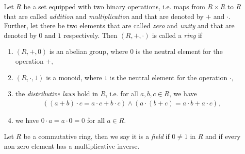 \begin{defn}\label{defn:ring}
	Let $R$ be a set equipped with two binary operations, i.e. maps from $R\times R$ to $R$ that are called \textit{addition} and \textit{multiplication} and that are denoted by $+$ and $\cdot$. Further, let there be two elements that are called \textit{zero} and \textit{unity} and that are denoted by $0$ and $1$ respectively. Then $(R, +, \cdot)$ is called a \textit{ring} if 
	
	\begin{enumerate}
		\item $(R, +, 0)$ is an abelian group, where $0$ is the neutral element for the operation $+$,
		\item $(R, \cdot, 1)$ is a monoid, where $1$ is the neutral element for the operation $\cdot$,
		\item the \textit{distributive laws} hold in $R$, i.e. for all $a, b, c\in R$, we have
		\begin{align*}
			\left((a + b)\cdot c = a\cdot c + b\cdot c\right) \wedge \left(a\cdot (b + c) = a\cdot b + a\cdot c\right),
		\end{align*}
		\item we have $0\cdot a = a\cdot 0 = 0$ for all $a\in R$.
	\end{enumerate}
\end{defn}

\begin{defn}\label{defn:field}
	Let $R$ be a commutative ring, then we say it is a \textit{field} if $0\neq 1$ in $R$ and if every non-zero element has a multiplicative inverse.
\end{defn}